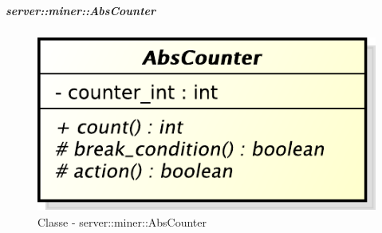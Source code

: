 		\subparagraph{server::miner::AbsCounter} %
		\label{subp:server_miner_AbsCounter}
		    \begin{figure}[!htbp]
 		 		\centering
 				\centerline{\includegraphics[scale=0.75]{./images/server/classes/miner/abs_counter.pdf}}
 				\caption{Classe - server::miner::AbsCounter}
			\end{figure}
